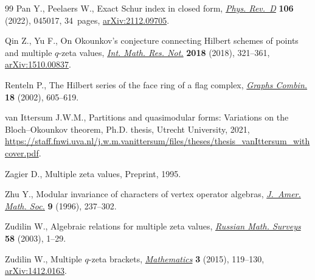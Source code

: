 \documentclass[10pt,a4paper]{amsart}
\numberwithin{equation}{section}
\theoremstyle{definition}
\begin{document}
\begin{thebibliography}{99}
Pan Y., Peelaers W., Exact {S}chur index in closed form,
 \href{https://doi.org/10.1103/physrevd.106.045017}{\textit{Phys. Rev.~D}}
 \textbf{106} (2022), 045017, 34~pages,
 \href{https://arxiv.org/abs/2112.09705}{arXiv:2112.09705}.

Qin Z., Yu F., On {O}kounkov's conjecture connecting {H}ilbert schemes of
 points and multiple {$q$}-zeta values,
 \href{https://doi.org/10.1093/imrn/rnw244}{\textit{Int. Math. Res. Not.}}
 \textbf{2018} (2018), 321--361,
 \href{https://arxiv.org/abs/1510.00837}{arXiv:1510.00837}.

Renteln P., The {H}ilbert series of the face ring of a flag complex,
 \href{https://doi.org/10.1007/s003730200045}{\textit{Graphs Combin.}}
 \textbf{18} (2002), 605--619.

van Ittersum J.W.M., Partitions and quasimodular forms: {V}ariations on the
 {B}loch--{O}kounkov theorem, Ph.D. thesis, {U}trecht {U}niversity, 2021,
 \url{https://staff.fnwi.uva.nl/j.w.m.vanittersum/files/theses/thesis_vanIttersum_withcover.pdf}.

Zagier D., Multiple zeta values, {P}reprint, 1995.

Zhu Y., Modular invariance of characters of vertex operator algebras,
 \href{https://doi.org/10.1090/S0894-0347-96-00182-8}{\textit{J.~Amer. Math.
 Soc.}} \textbf{9} (1996), 237--302.

Zudilin W., Algebraic relations for multiple zeta values,
 \href{https://doi.org/10.1070/RM2003v058n01ABEH000592}{\textit{Russian Math.
 Surveys}} \textbf{58} (2003), 1--29.

Zudilin W., Multiple $q$-zeta brackets,
 \href{https://doi.org/10.3390/math3010119}{\textit{Mathematics}} \textbf{3}
 (2015), 119--130, \href{https://arxiv.org/abs/1412.0163}{arXiv:1412.0163}.

\end{thebibliography}
\end{document}
